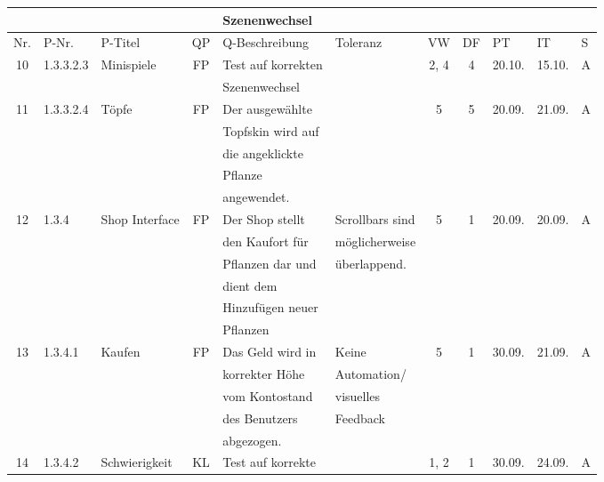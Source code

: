 \begin{longtable}{|c|l|l|c|l|l|c|c|l|l|l|}
            &       &            &    & Szenenwechsel &   &   & & & &\\[5ex]
            \hline
            \hline
            Nr. & P-Nr. & P-Titel & QP & Q-Beschreibung & Toleranz & VW & DF & PT & IT & S \\[0.5ex]
            \hline\hline
            10 & 1.3.3.2.3 & Minispiele & FP & Test auf korrekten &  & 2, 4 & 4 & 20.10. & 15.10. & A \\
            &       &            &    & Szenenwechsel &   &   & & & &\\
            \hline
            11 & 1.3.3.2.4 & Töpfe & FP & Der ausgewählte &  & 5 & 5 & 20.09. & 21.09. & A \\
            &       &            &    & Topfskin wird auf&   &   & & & &\\
            &       &            &    & die angeklickte &   &   & & & &\\
            &       &            &    & Pflanze &   &   & & & &\\
            &       &            &    & angewendet. &   &   & & & &\\
            \hline
            12 & 1.3.4 & Shop Interface & FP & Der Shop stellt & Scrollbars sind & 5 & 1 & 20.09. & 20.09. & A \\
            &       &            &    & den Kaufort für & möglicherweise  &   & & & &\\
            &       &            &    & Pflanzen dar und & überlappend.  &   & & & &\\
            &       &            &    & dient dem &   &   & & & &\\
            &       &            &    & Hinzufügen neuer &   &   & & & &\\
            &       &            &    & Pflanzen &   &   & & & &\\
            \hline
            13 & 1.3.4.1 & Kaufen & FP & Das Geld wird in & Keine & 5 & 1 & 30.09. & 21.09. & A \\
            &       &            &    & korrekter Höhe & Automation/  &   & & & &\\
            &       &            &    & vom Kontostand &  visuelles &   & & & &\\
            &       &            &    & des Benutzers & Feedback   &   & & & &\\
            &       &            &    & abgezogen. &   &   & & & &\\
            \hline
            14 & 1.3.4.2 & Schwierigkeit & KL & Test auf korrekte &  & 1, 2 & 1 & 30.09. & 24.09. & A \\

\end{longtable}
